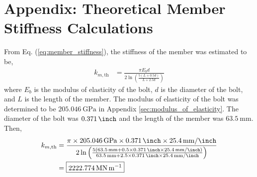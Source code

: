 \section{Appendix: Theoretical Member Stiffness Calculations}
\label{app:theoretical_member_stiffness}

From Eq. (\ref{eq:member_stiffness}), the stiffness of the member was estimated to be, 
\begin{align*}
    k_{m, \text{th}} &= \frac{\pi E_b d}{2\ln\left(\frac{5(L+0.5d)}{L+2.5d}\right)}
\end{align*}
where $E_b$ is the modulus of elasticity of the bolt, $d$ is the diameter of the bolt, and $L$ is the length of the member. The modulus of elasticity of the bolt was determined to be $\qty{205.046}{\giga\pascal}$ in Appendix \ref{sec:modulus_of_elasticity}. The diameter of the bolt was $\qty{0.371}{\inch}$ and the length of the member was $\qty{63.5}{\milli\meter}$. Then,
\begin{align*}
    k_{m, \text{th}} &= \frac{\pi \times \qty{205.046}{\giga\pascal} \times \qty{0.371}{\inch} \times \qty{25.4}{\milli\meter\per\inch}}{2\ln\left(\frac{5(\qty{63.5}{\milli\meter}+0.5\times\qty{0.371}{\inch}\times \qty{25.4}{\milli\meter\per\inch})}{\qty{63.5}{\milli\meter}+2.5\times\qty{0.371}{\inch}\times \qty{25.4}{\milli\meter\per\inch}}\right)} \\
    &= \boxed{\qty{2222.774}{\mega\newton\per\meter}}
\end{align*}

